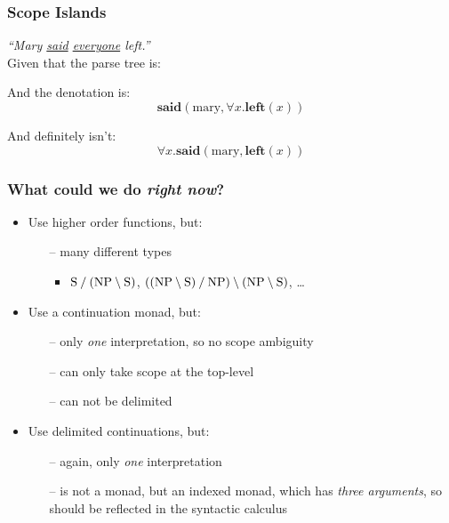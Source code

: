 \documentclass[12pt,t]{beamer}
\begin{document}
\begin{frame}[label=scope-islands]
  \frametitle{Scope Islands}
  \textit{``Mary \underline{said} \underline{everyone} left.''}
  \\[0.125\baselineskip]
  Given that the parse tree is:
  \\[1\baselineskip]
  \begin{center}
  \end{center}
  \begin{minipage}{0.5\linewidth}
    And the denotation is:
    $$\mathbf{said}(\text{mary},\forall x.\mathbf{left}(x))$$
  \end{minipage}%
  \begin{minipage}{0.5\linewidth}
    And definitely isn't:
    $$\forall x.\mathbf{said}(\text{mary},\mathbf{left}(x))$$
  \end{minipage}
  \vfill
\end{frame}

\begin{frame}
  \frametitle{What could we do \textit{right now}?}
  \vfill
  \begin{itemize}
  \item
    Use higher order functions, but:
    \begin{itemize}
    \item[--] many different types
      \begin{itemize}
      \item
        $\text{S}\mathbin{\slash}(\text{NP}\mathbin{\backslash}\text{S})$,
        $((\text{NP}\mathbin{\backslash}\text{S})\mathbin{\slash}\text{NP})\mathbin{\backslash}(\text{NP}\mathbin{\backslash}\text{S})$,
        \ldots
      \end{itemize}
    \end{itemize}
  \item
    Use a continuation monad, but:
    \begin{itemize}
    \item[--] only \textit{one} interpretation, so no scope ambiguity
    \item[--] can only take scope at the top-level
    \item[--] can not be delimited
    \end{itemize}
  \item
    Use delimited continuations, but:
    \begin{itemize}
    \item[--] again, only \textit{one} interpretation
    \item[--] is not a monad, but an indexed monad, which has
      \textit{three arguments}, so should be reflected in the
      syntactic calculus
    \end{itemize}
  \end{itemize}
  \vfill
\end{frame}
\end{document}
